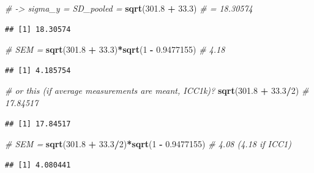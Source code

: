 \documentclass[
]{article}
\newenvironment{Shaded}{\begin{snugshade}}{\end{snugshade}}
\newcommand{\CommentTok}[1]{\textcolor[rgb]{0.56,0.35,0.01}{\textit{#1}}}
\newcommand{\DecValTok}[1]{\textcolor[rgb]{0.00,0.00,0.81}{#1}}
\newcommand{\FloatTok}[1]{\textcolor[rgb]{0.00,0.00,0.81}{#1}}
\newcommand{\FunctionTok}[1]{\textcolor[rgb]{0.13,0.29,0.53}{\textbf{#1}}}
\newcommand{\NormalTok}[1]{#1}
\newcommand{\SpecialCharTok}[1]{\textcolor[rgb]{0.81,0.36,0.00}{\textbf{#1}}}
\begin{document}
\begin{Shaded}
\begin{Highlighting}[]
\CommentTok{\# {-}\textgreater{} sigma\_y = SD\_pooled = }
\FunctionTok{sqrt}\NormalTok{(}\FloatTok{301.8} \SpecialCharTok{+} \FloatTok{33.3}\NormalTok{) }\CommentTok{\# = 18.30574}
\end{Highlighting}
\end{Shaded}

\begin{verbatim}
## [1] 18.30574
\end{verbatim}

\begin{Shaded}
\begin{Highlighting}[]
\CommentTok{\# SEM = }
\FunctionTok{sqrt}\NormalTok{(}\FloatTok{301.8} \SpecialCharTok{+} \FloatTok{33.3}\NormalTok{)}\SpecialCharTok{*}\FunctionTok{sqrt}\NormalTok{(}\DecValTok{1} \SpecialCharTok{{-}} \FloatTok{0.9477155}\NormalTok{) }\CommentTok{\# 4.18}
\end{Highlighting}
\end{Shaded}

\begin{verbatim}
## [1] 4.185754
\end{verbatim}

\begin{Shaded}
\begin{Highlighting}[]
\CommentTok{\# or this (if average measurements are meant, ICC1k)?}
\FunctionTok{sqrt}\NormalTok{(}\FloatTok{301.8} \SpecialCharTok{+} \FloatTok{33.3}\SpecialCharTok{/}\DecValTok{2}\NormalTok{) }\CommentTok{\# 17.84517}
\end{Highlighting}
\end{Shaded}

\begin{verbatim}
## [1] 17.84517
\end{verbatim}

\begin{Shaded}
\begin{Highlighting}[]
\CommentTok{\# SEM = }
\FunctionTok{sqrt}\NormalTok{(}\FloatTok{301.8} \SpecialCharTok{+} \FloatTok{33.3}\SpecialCharTok{/}\DecValTok{2}\NormalTok{)}\SpecialCharTok{*}\FunctionTok{sqrt}\NormalTok{(}\DecValTok{1} \SpecialCharTok{{-}} \FloatTok{0.9477155}\NormalTok{) }\CommentTok{\# 4.08 (4.18 if ICC1)}
\end{Highlighting}
\end{Shaded}

\begin{verbatim}
## [1] 4.080441
\end{verbatim}
\end{document}
